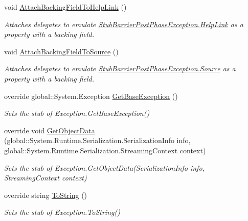 \begin{DoxyCompactItemize}
void \hyperlink{class_system_1_1_threading_1_1_fakes_1_1_stub_barrier_post_phase_exception_a75207c6a3070a8528f9c0759fcf502db}{Attach\-Backing\-Field\-To\-Help\-Link} ()
\begin{DoxyCompactList}\small\item\em Attaches delegates to emulate \hyperlink{class_system_1_1_threading_1_1_fakes_1_1_stub_barrier_post_phase_exception_abbc0c1926b5e21f4f0a8019e2f622dd7}{Stub\-Barrier\-Post\-Phase\-Exception.\-Help\-Link} as a property with a backing field.\end{DoxyCompactList}\item 
void \hyperlink{class_system_1_1_threading_1_1_fakes_1_1_stub_barrier_post_phase_exception_ae9bb1713f63d5fcc0c4223fa168e58e5}{Attach\-Backing\-Field\-To\-Source} ()
\begin{DoxyCompactList}\small\item\em Attaches delegates to emulate \hyperlink{class_system_1_1_threading_1_1_fakes_1_1_stub_barrier_post_phase_exception_a9dfdd19bb60a25c3596f1d73de8a0b84}{Stub\-Barrier\-Post\-Phase\-Exception.\-Source} as a property with a backing field.\end{DoxyCompactList}\item 
override global\-::\-System.\-Exception \hyperlink{class_system_1_1_threading_1_1_fakes_1_1_stub_barrier_post_phase_exception_a9540ee0faffa78953440b6c66d7a5ea7}{Get\-Base\-Exception} ()
\begin{DoxyCompactList}\small\item\em Sets the stub of Exception.\-Get\-Base\-Exception()\end{DoxyCompactList}\item 
override void \hyperlink{class_system_1_1_threading_1_1_fakes_1_1_stub_barrier_post_phase_exception_adc897b57a021e35b7855e1ee0a61a5fb}{Get\-Object\-Data} (global\-::\-System.\-Runtime.\-Serialization.\-Serialization\-Info info, global\-::\-System.\-Runtime.\-Serialization.\-Streaming\-Context context)
\begin{DoxyCompactList}\small\item\em Sets the stub of Exception.\-Get\-Object\-Data(\-Serialization\-Info info, Streaming\-Context context)\end{DoxyCompactList}\item 
override string \hyperlink{class_system_1_1_threading_1_1_fakes_1_1_stub_barrier_post_phase_exception_a3b350c578730bd31c1e453a1985418d9}{To\-String} ()
\begin{DoxyCompactList}\small\item\em Sets the stub of Exception.\-To\-String()\end{DoxyCompactList}\end{DoxyCompactItemize}
